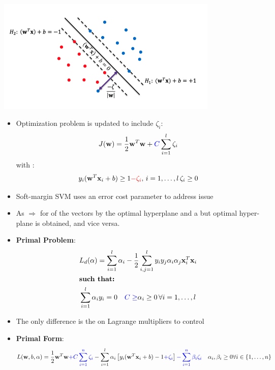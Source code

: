 \documentclass{tron}
\begin{document}
\begin{definition}{}
	\includegraphics[width=400px]{Figs/slide8/svm-soft}
	
	\begin{itemize}
		\item Optimization problem is updated to include  $\zeta_i$:
			\begin{equation}
				J(\mathbf{w}) = \frac12 \mathbf{w}^T \mathbf{w} + \textcolor{blue}{C} \sum_{i=1}^l \zeta_i
			\end{equation}
			with :
			\begin{equation}
				y_i(\mathbf{w}^T \mathbf{x}_i + b) \geq 1\textcolor{red}{- \zeta_i}, \, i = 1, \dots, l\, \zeta_i \geq 0
			\end{equation}
		\item Soft-margin SVM uses an error cost parameter  to address  issue
		\item As  \red{$\uparrow$} $\Rightarrow$  \red{$\downarrow$} for  of the vectors by the optimal hyperplane and a  but  optimal hyper-plane is obtained, and vice versa.
		\item \textbf{Primal Problem}:
		\begin{align}
			& L_d(\alpha) = \sum_{i=1}^l \alpha_i - \frac12 \sum_{i, j=1}^l y_i y_j \alpha_i \alpha_j \mathbf{x}_i^T \mathbf{x}_i \\
			& \textbf{such that:}\\
			& \sum_{i=1}^l \alpha_i y_i = 0 \quad \textcolor{blue}{C \geq} \alpha_i \geq 0 \, \forall i = 1, \dots, l
		\end{align}
		\item The only difference is the   on Lagrange multipliers to control 
		\item \textbf{Primal Form}:
		\begin{equation}
			L(\wv, b, \alpha) = \frac12 \wv^T \wv \blue{+ C \sum_{i=1}^n \zeta_i}- \sum_{i=1}^l \alpha_i \left[ y_i (\wv^T \xv_i + b) - 1 \blue{+ \zeta_i}\right] \blue{ - \sum_{i=1}^n \beta_i \zeta_i} \quad \alpha_i,\beta_i \geq 0 \forall i \in \{1, \dots, n\}

\end{equation}
\end{itemize}
\end{definition}
\end{document}
